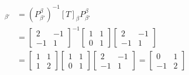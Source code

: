 \begin{solution}
\begin{align*}
[T]_{\beta'} &= (P_{\beta'}^\beta)^{-1} [T]_\beta P_{\beta'}^\beta \\
&= 
\begin{bmatrix}
2 & -1 \\
-1 & 1
\end{bmatrix}^{-1}
\begin{bmatrix}
1 & 1 \\
0 & 1
\end{bmatrix}
\begin{bmatrix}
2 & -1 \\
-1 & 1
\end{bmatrix} \\
&= 
\begin{bmatrix}
1 & 1 \\
1 & 2
\end{bmatrix}
\begin{bmatrix}
1 & 1 \\
0 & 1
\end{bmatrix}
\begin{bmatrix}
2 & -1 \\
-1 & 1
\end{bmatrix}
=
\begin{bmatrix}
0 & 1\\
-1 & 2
\end{bmatrix}
\end{align*}
\end{solution}

